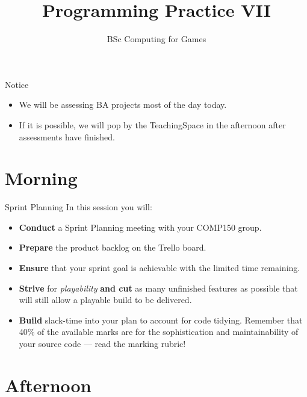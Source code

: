 \documentclass[xcolor={dvipsnames}]{beamer}\usepackage{etoolbox}\newtoggle{printable}\togglefalse{printable}
\begin{document}
\title{Programming Practice VII}   
\subtitle{BSc Computing for Games}

\frame{\titlepage} 

\begin{frame}{Notice}
	
	\begin{itemize}
		\item We will be assessing BA projects most of the day today.
		\item If it is possible, we will pop by the TeachingSpace in the afternoon after assessments have finished.
	\end{itemize}
\end{frame}	

\part{Morning}
\frame{\partpage}

\begin{frame}{Sprint Planning}
	In this session you will:
	
	\begin{itemize}
		\item \textbf{Conduct} a Sprint Planning meeting with your COMP150 group.
		\item \textbf{Prepare} the product backlog on the Trello board.
		\item \textbf{Ensure} that your sprint goal is achievable with the limited time remaining.
		\item \textbf{Strive} for \textit{playability} \textbf{and cut} as many unfinished features as possible that will still allow a playable build to be delivered. 
		\item \textbf{Build} slack-time into your plan to account for code tidying. Remember that 40\% of the available marks are for the sophistication and maintainability of your source code --- read the marking rubric! 
	\end{itemize}
\end{frame}

\part{Afternoon}
\frame{\partpage}
\end{document}
